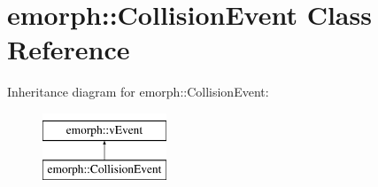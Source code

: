 \hypertarget{classemorph_1_1CollisionEvent}{\section{emorph\-:\-:Collision\-Event Class Reference}
\label{classemorph_1_1CollisionEvent}
}
Inheritance diagram for emorph\-:\-:Collision\-Event\-:\begin{figure}[H]
\begin{center}
\leavevmode
\includegraphics[height=2.000000cm]{classemorph_1_1CollisionEvent}
\end{center}
\end{figure}
